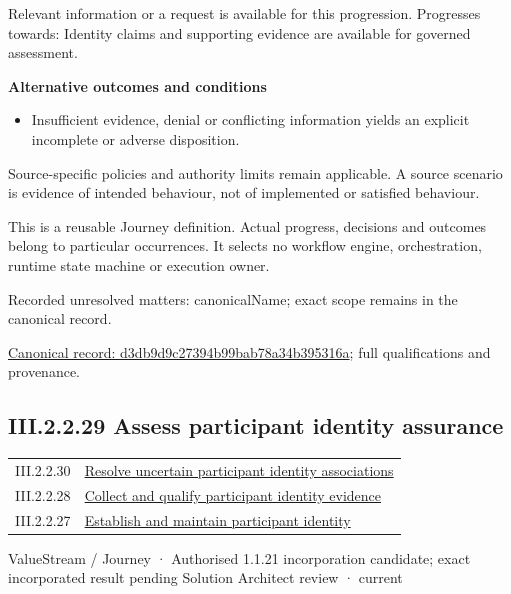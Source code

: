 Relevant information or a request is available for this progression. Progresses towards: Identity claims and supporting evidence are available for governed assessment.



\par\medskip\textbf{Alternative outcomes and conditions}\par


\begin{itemize}


\item Insufficient evidence, denial or conflicting information yields an explicit incomplete or adverse disposition.

\end{itemize}


Source-specific policies and authority limits remain applicable. A source scenario is evidence of intended behaviour, not of implemented or satisfied behaviour.



This is a reusable Journey definition. Actual progress, decisions and outcomes belong to particular occurrences. It selects no workflow engine, orchestration, runtime state machine or execution owner.


{\small Recorded unresolved matters: canonicalName; exact scope remains in the canonical record.}\par
{\footnotesize \href{../../../../../../../continuum/strategy/value-stream/d3db9d9c27394b99bab78a34b395316a.md}{Canonical record: d3db9d9c27394b99bab78a34b395316a}; full qualifications and provenance.}\par
\subsection*{III.2.2.29 Assess participant identity assurance}
\label{navigation:III.2.2.29}

\begin{longtable}{p{.22\linewidth}p{.73\linewidth}}
III.2.2.30 & \hyperref[element:32fcf92667ae46578ab213f879c8a799]{Resolve uncertain participant identity associations} \\
III.2.2.28 & \hyperref[element:d3db9d9c27394b99bab78a34b395316a]{Collect and qualify participant identity evidence} \\
III.2.2.27 & \hyperref[element:f0ce31d5b71c4c5ab37ade566b224808]{Establish and maintain participant identity} \\
\end{longtable}
\label{element:215676da8a3040bba2fa02574a4c3443}
{\small ValueStream / Journey · Authorised 1.1.21 incorporation candidate; exact incorporated result pending Solution Architect review · current}\par

